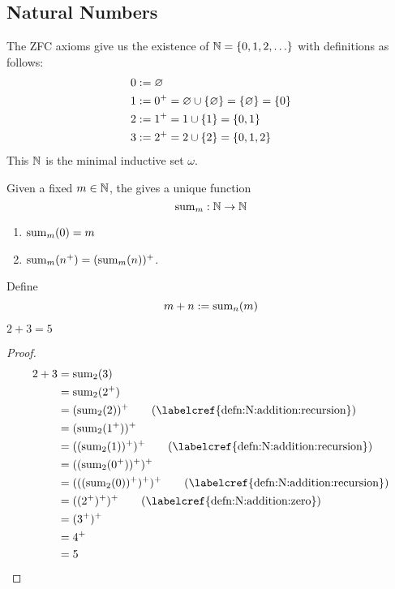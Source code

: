 \subsection{Natural Numbers}

The ZFC axioms give us the existence of $\N = \set{0, 1, 2, \dots}$ with definitions as follows:
\begin{align*}
    0 &:= \varnothing \\
    1 &:= 0^{+} = \varnothing \cup \set{\varnothing} = \set{\varnothing} = \set{0} \\
    2 &:= 1^{+} = 1 \cup \set{1} = \set{0, 1} \\
    3 &:= 2^{+} = 2 \cup \set{2} = \set{0, 1, 2}
\end{align*}
This $\mathbb{N}$ is the minimal inductive set $\omega$.

\begin{defn} \label{defn:N:addition}
    Given a fixed $m \in \mathbb{N}$, the  gives a unique function \[
        \mathrm{sum}_{m} : \mathbb{N} \to \mathbb{N}
    \]
    \begin{enumerate}[label=(A\arabic*)]
        \item\label{defn:N:addition:zero} $\mathrm{sum}_{m}({0}) = m$ 
        \item\label{defn:N:addition:recursion} $\mathrm{sum}_{m}({n^{+}}) = (\mathrm{sum}_{m}({n}))^{+}$.
    \end{enumerate}
    Define \[
        m + n := \mathrm{sum}_{n}({m})
    \]
\end{defn}

\begin{prop}
    $2 + 3 = 5$
\end{prop}
\begin{proof}
    \begin{align*}
        2 + 3 &= \psum{2}{3} \\
        &= \psum{2}{2^{+}} \\
        &= (\psum{2}{2})^{+} \tag{\labelcref{defn:N:addition:recursion}}\\
        &= (\psum{2}{1^{+}})^{+} \\
        &= ((\psum{2}{1})^{+})^{+} \tag{\labelcref{defn:N:addition:recursion}}\\
        &= ((\psum{2}{0^{+}})^{+})^{+} \\
        &= (((\psum{2}{0})^{+})^{+})^{+} \tag{\labelcref{defn:N:addition:recursion}}\\
        &= ((2^{+})^{+})^{+} \tag{\labelcref{defn:N:addition:zero}}\\
        &= (3^{+})^{+} \\
        &= 4^{+} \\
        &= 5 \qedhere
    \end{align*}
\end{proof}

